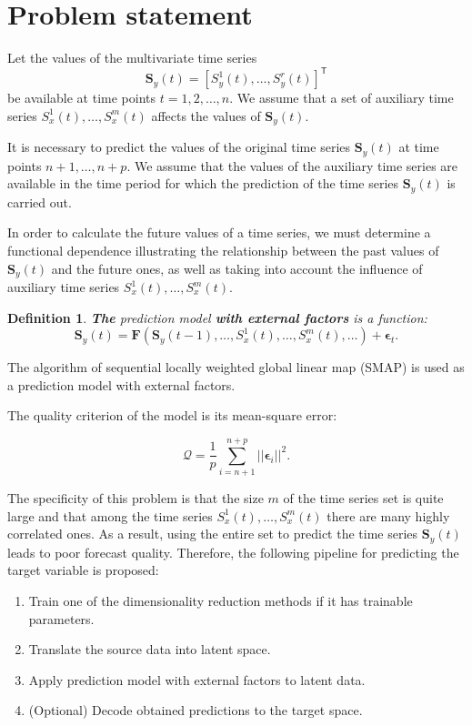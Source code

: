 \documentclass[bst/sn-mathphys]{sn-jnl}%
\newcommand{\bS}{\mathbf{S}}
\newcommand{\bF}{\mathbf{F}}
\renewcommand{\T}{^{\mathsf{T}}}
\theoremstyle{thmstyleone}%
\theoremstyle{thmstyletwo}%
\theoremstyle{thmstylethree}%
\newtheorem{definition}{Definition}%
\begin{document}
\section{Problem statement}
Let the values of the multivariate time series 
\[ \bS_y(t) = [S_y^1(t), \ldots, S_y^r(t)] \T \]
be available at time points $t = 1, 2, \ldots, n$.
We assume that a set of auxiliary time series $S_x^1(t), \ldots, S_x^m(t)$ affects the values of $\bS_y(t)$.

It is necessary to predict the values of the original time series $\bS_y(t)$ at time points $n+1, \ldots, n+p$.
We assume that the values of the auxiliary time series are available in the time period for which the prediction of the time series $\bS_y(t)$ is carried out.

In order to calculate the future values of a time series, we must determine a functional dependence illustrating the relationship between the past values of $\bS_y(t)$ and the future ones, as well as taking into account the influence of auxiliary time series $S_x^1(t), \ldots, S_x^m(t)$.

\begin{definition}
	\textbf{The} \emph{prediction model} \textbf{with external factors} is a function:
	\begin{equation*}
		\bS_y(t) = \bF(\bS_y(t-1), \ldots, S_x^1(t), \ldots, S_x^m(t), \ldots) + \boldsymbol{\epsilon}_t.
	\end{equation*}
\end{definition}

The algorithm of sequential locally weighted global linear map (SMAP) \cite{sugihara1994nonlinear} is used as a prediction model with external factors.

The quality criterion of the model is its mean-square error:

\begin{equation*}
	\mathcal{Q} = \dfrac{1}{p} \sum\limits_{i=n+1}^{n+p} ||\boldsymbol{\epsilon}_i||^2.
\end{equation*}

The specificity of this problem is that the size $m$ of the time series set is quite large and that among the time series $S_x^1(t), \ldots, S_x^m(t)$ there are many highly correlated ones.
As a result, using the entire set to predict the time series $\bS_y(t)$ leads to poor forecast quality.
Therefore, the following pipeline for predicting the target variable is proposed:

\begin{enumerate}
	\item Train one of the dimensionality reduction methods if it has trainable parameters.
	\item Translate the source data into latent space.
	\item Apply prediction model with external factors to latent data.
	\item (Optional) Decode obtained predictions to the target space.
\end{enumerate}
\end{document}
